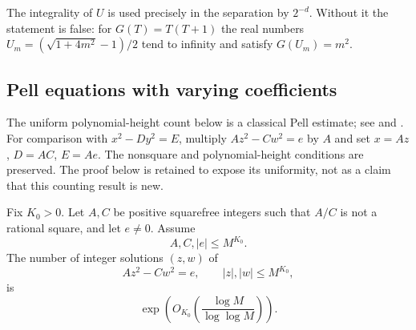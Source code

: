 The integrality of $U$ is used precisely in the separation by $2^{-d}$.
Without it the statement is false: for $G(T)=T(T+1)$ the real numbers
$U_m=(\sqrt{1+4m^2}-1)/2$ tend to infinity and satisfy $G(U_m)=m^2$.

\subsection{Pell equations with varying coefficients}
The uniform polynomial-height count below is a classical Pell estimate;
see \cite[arXiv text, Lemma~4]{CillerueloGaraev2011} and
\cite[Lemma~2.10 and Remark~2.12]{Tao2026}.
For comparison with $x^2-Dy^2=E$, multiply $Az^2-Cw^2=e$ by $A$
and set $x=Az$, $D=AC$, $E=Ae$. The nonsquare and polynomial-height
conditions are preserved. The proof below is retained to expose its
uniformity, not as a claim that this counting result is new.
\begin{lemma}\label{supp:lem:pell}
Fix $K_0>0$. Let $A,C$ be positive squarefree integers such that $A/C$ is not a rational square, and let $e\ne0$. Assume
\[
 A,C,|e|\le M^{K_0}.
\]
The number of integer solutions $(z,w)$ of
\[
 Az^2-Cw^2=e,
 \qquad
 |z|,|w|\le M^{K_0},
\]
is
\begin{equation}\label{supp:eq:pell-uniform}
 \exp\!\left(O_{K_0}\!\left(\frac{\log M}{\log\log M}\right)\right).
\end{equation}
\end{lemma}

